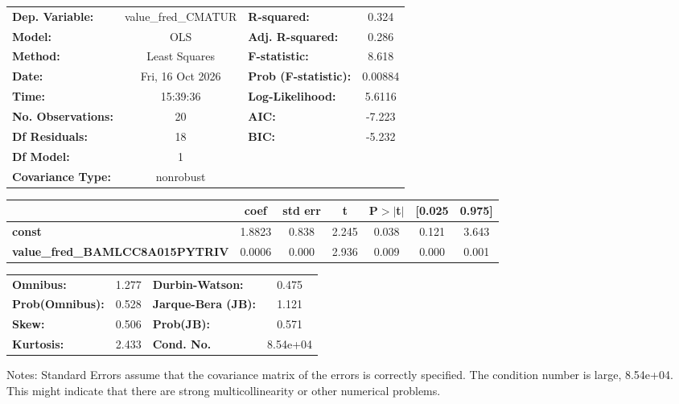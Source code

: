 \begin{center}
\begin{tabular}{lclc}
\toprule
\textbf{Dep. Variable:}                 & value\_fred\_CMATUR & \textbf{  R-squared:         } &     0.324   \\
\textbf{Model:}                         &         OLS         & \textbf{  Adj. R-squared:    } &     0.286   \\
\textbf{Method:}                        &    Least Squares    & \textbf{  F-statistic:       } &     8.618   \\
\textbf{Date:}                          &   Fri, 16 Oct 2026  & \textbf{  Prob (F-statistic):} &  0.00884    \\
\textbf{Time:}                          &       15:39:36      & \textbf{  Log-Likelihood:    } &    5.6116   \\
\textbf{No. Observations:}              &            20       & \textbf{  AIC:               } &    -7.223   \\
\textbf{Df Residuals:}                  &            18       & \textbf{  BIC:               } &    -5.232   \\
\textbf{Df Model:}                      &             1       & \textbf{                     } &             \\
\textbf{Covariance Type:}               &      nonrobust      & \textbf{                     } &             \\
\bottomrule
\end{tabular}
\begin{tabular}{lcccccc}
                                        & \textbf{coef} & \textbf{std err} & \textbf{t} & \textbf{P$> |$t$|$} & \textbf{[0.025} & \textbf{0.975]}  \\
\midrule
\textbf{const}                          &       1.8823  &        0.838     &     2.245  &         0.038        &        0.121    &        3.643     \\
\textbf{value\_fred\_BAMLCC8A015PYTRIV} &       0.0006  &        0.000     &     2.936  &         0.009        &        0.000    &        0.001     \\
\bottomrule
\end{tabular}
\begin{tabular}{lclc}
\textbf{Omnibus:}       &  1.277 & \textbf{  Durbin-Watson:     } &    0.475  \\
\textbf{Prob(Omnibus):} &  0.528 & \textbf{  Jarque-Bera (JB):  } &    1.121  \\
\textbf{Skew:}          &  0.506 & \textbf{  Prob(JB):          } &    0.571  \\
\textbf{Kurtosis:}      &  2.433 & \textbf{  Cond. No.          } & 8.54e+04  \\
\bottomrule
\end{tabular}
\end{center}

Notes: \newline
 [1] Standard Errors assume that the covariance matrix of the errors is correctly specified. \newline
 [2] The condition number is large, 8.54e+04. This might indicate that there are \newline
 strong multicollinearity or other numerical problems.